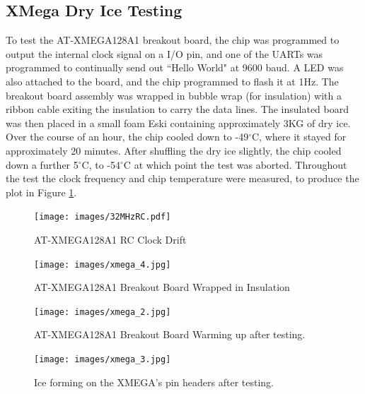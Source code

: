\documentclass[a4paper,12pt]{article}
\begin{document}
\newpage
\begin{appendices}
\section{XMega Dry Ice Testing}
\label{xmegadryice}
To test the AT-XMEGA128A1 breakout board, the chip was programmed to output the internal clock signal on a I/O pin, and one of the UARTs was programmed to continually send out ``Hello World" at 9600 baud. A LED was also attached to the board, and the chip programmed to flash it at 1Hz. The breakout board assembly was wrapped in bubble wrap (for insulation) with a ribbon cable exiting the insulation to carry the data lines. The insulated board was then placed in a small foam Eski containing approximately 3KG of dry ice. Over the course of an hour, the chip cooled down to -49$^\circ$C, where it stayed for approximately 20 minutes. After shuffling the dry ice slightly, the chip cooled down a further 5$^\circ$C, to -54$^\circ$C at which point the test was aborted. Throughout the test the clock frequency and chip temperature were measured, to produce the plot in Figure \ref{32mhzrc}.


\begin{figure}[h!]
\begin{center}
\texttt{[image: images/32MHzRC.pdf]}
\caption{AT-XMEGA128A1 RC Clock Drift}
\label{32mhzrc}
\end{center}
\end{figure}

\begin{figure}[h!]
\begin{center}
\texttt{[image: images/xmega\_4.jpg]}
\caption{AT-XMEGA128A1 Breakout Board Wrapped in Insulation}
\label{xmega_4}
\end{center}
\end{figure}

\newpage
\begin{figure}[h!]
\begin{center}
\texttt{[image: images/xmega\_2.jpg]}
\caption{AT-XMEGA128A1 Breakout Board Warming up after testing.}
\label{xmega_2}
\end{center}
\end{figure}

\begin{figure}[h!]
\begin{center}
\texttt{[image: images/xmega\_3.jpg]}
\caption{Ice forming on the XMEGA's pin headers after testing.}
\label{xmega_3}
\end{center}
\end{figure}



\end{appendices}
\end{document}
